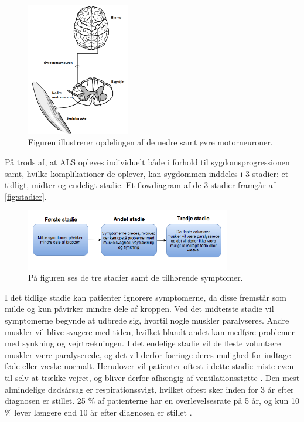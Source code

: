 \begin{figure}[H]
\centering
\includegraphics[width=0.4\textwidth]{figures/motorneuroner.png}
\caption{Figuren illustrerer opdelingen af de nedre samt øvre motorneuroner. \citep{miller2005}}
\label{fig:motorneuroner}
\end{figure}

På trods af, at ALS opleves individuelt både i forhold til sygdomsprogressionen samt, hvilke komplikationer de oplever, kan sygdommen inddeles i 3 stadier: et tidligt, midter og endeligt stadie. Et flowdiagram af de 3 stadier framgår af \autoref{fig:stadier}.

\begin{figure}[H]
\centering
\includegraphics[width=0.8\textwidth]{figures/stadier.png}
\caption{På figuren ses de tre stadier samt de tilhørende symptomer.}
\label{fig:stadier}
\end{figure}

I det tidlige stadie kan patienter ignorere symptomerne, da disse fremstår som milde og kun påvirker mindre dele af kroppen. 
Ved det midterste stadie vil symptomerne begynde at udbrede sig, hvortil nogle muskler paralyseres. Andre muskler vil blive svagere med tiden, hvilket blandt andet kan medføre problemer med synkning og vejrtrækningen. I det endelige stadie vil de fleste voluntære muskler være paralyserede, og det vil derfor forringe deres mulighed for indtage føde eller væske normalt. Herudover vil patienter oftest i dette stadie miste even til selv at trække vejret, og bliver derfor afhængig af ventilationsstøtte \citep{themusculardystrophyassociation2016}.
Den mest almindelige dødsårsag er respirationssvigt, hvilket oftest sker inden for 3 år efter diagnosen er stillet. 25 \% af patienterne har en overlevelsesrate på 5 år, og kun 10 \% lever længere end 10 år efter diagnosen er stillet \citep{grehl2011, miller2005}.




